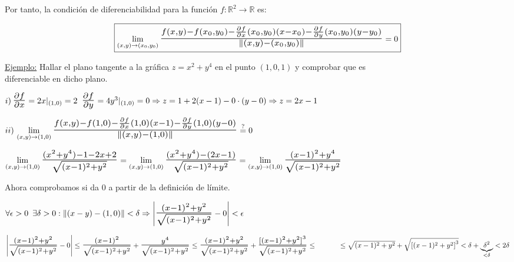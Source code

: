 \documentclass[10pt, titlepage]{article}
\newcommand{\eqc}[1]{\stackrel{\mathclap{\normalfont\mbox{\scriptsize{#1}}}}{=}}
\newcommand{\R}{\mathbb{R}}
\newcommand{\bfrac}[2]{\scalebox{1.4}{$\frac{#1}{#2}$}}
\newcommand{\spac}{\, \, \,}
\newcommand{\dindent}{\indent\indent}
\begin{document}
Por tanto, la condición de diferenciabilidad para la función $f : \R^2 \to \R$ es:
\vspace{3mm}


\[
\boxed{
\displaystyle \lim_{(x, y) \to (x_0, y_0)} \bfrac{f (x, y) - f  (x_0, y_0) - \frac{\partial f}{\partial x} (x_0, y_0)
(x - x_0) - \frac{\partial f}{\partial y} (x_0, y_0) (y - y_0)}{\|(x, y) - (x_0, y_0)\|} = 0
}
\]
\vspace{3mm}

\underline{Ejemplo:} Hallar el plano tangente a la gráfica $z = x^2 + y^4$ en el punto $(1, 0, 1)$ y 
comprobar que es \\ \indent diferenciable en dicho plano.
\vspace{5mm}

\dindent $i) \, \bfrac{\partial f}{\partial x} = 2x |_{(1, 0)} = 2 \spac \bfrac{\partial f}{\partial y} = 4 y^3 |_{(1, 0)} = 
0 \Rightarrow z = 1 + 2(x -1) - 0 \cdot (y - 0) \Rightarrow  z = 2x -1$
\vspace{3mm}

\dindent $ii) \, \displaystyle \lim_{(x, y) \to (1, 0)} \bfrac{f (x, y) - f(1, 0) - \frac{\partial f}{\partial x} (1, 0) (x -1) - 
\frac{\partial f}{\partial y} (1, 0) (y - 0)}{\|(x, y) - (1, 0)\|} \eqc{\text{?}} 0$
\vspace{2mm}

\dindent $\displaystyle \lim_{(x, y) \to (1, 0)} \bfrac{(x^2 + y^4) - 1 - 2x + 2}{\sqrt{ (x - 1)^2 + y^2}} = 
\lim_{(x, y) \to (1, 0)} \bfrac{(x^2 + y^4) - (2x - 1)}{\sqrt{(x - 1)^2 + y^2}} = \lim_{(x, y) \to (1, 0)} 
\bfrac{(x - 1)^2 + y^4}{\sqrt{(x -1)^2 + y^2}}$
\vspace{5mm}

\dindent Ahora comprobamos si da 0 a partir de la definición de límite.
\vspace{3mm}

\dindent $\forall \epsilon > 0 \spac \exists \delta > 0 : \|(x - y) - (1, 0)\| < \delta \Rightarrow \left | \bfrac{(x - 1)^2 
+ y^2}{\sqrt{(x - 1)^2 + y^2}} - 0 \right | < \epsilon$
\vspace{3mm}

\dindent $\left | \bfrac{(x - 1)^2 + y^2}{\sqrt{(x - 1)^2 + y^2}} - 0 \right | \leq \bfrac{(x - 1)^2}
{\sqrt{(x - 1)^2 + y^2}} + \bfrac{y^4}{\sqrt{(x - 1)^2 + y^2}} \leq \bfrac{(x - 1)^2 + y^2}{\sqrt{(x - 
1)^2 + y^2}} + \bfrac{{[(x - 1)^2 + y^2]}^3}{\sqrt{(x - 1)^2 + y^2}} \leq \\ \dindent \leq \sqrt{(x - 1)^2 
+ y^2} + \sqrt{{[(x - 1)^2 + y^2]}^3} < \delta + \underbrace{\delta^2}_{< \delta} < 2 \delta$
\vspace{3mm}
\end{document}
